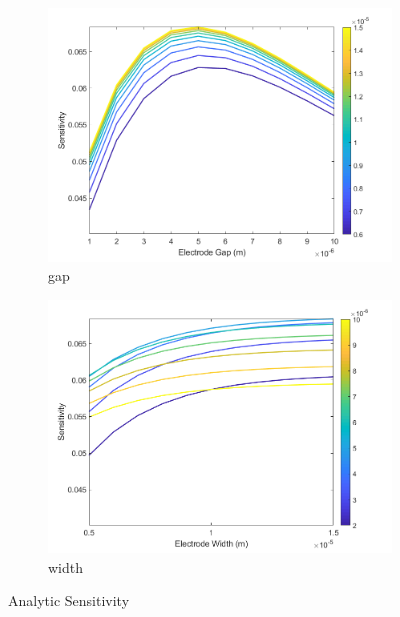 \begin{figure}[h]
\begin{subfigure}[b]{0.49\textwidth}
        \centering
        \includegraphics[width=\textwidth]{images/analytic_sun_gapXsensitivity.png}
        \caption{gap}
    \end{subfigure}
    \hfill
    \begin{subfigure}[b]{0.49\textwidth}
        \centering
        \includegraphics[width=\textwidth]{images/analytic_sun_widthXsensitivity.png}
        \caption{width}
    \end{subfigure}
    \caption[Analytic Sensitivity]{Analytic Sensitivity}
    \label{fig:analytic_sensitivity}
\end{figure}

